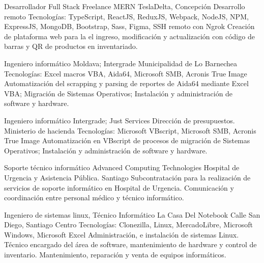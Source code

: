 \documentclass[draft,color,12pt,letterpaper,sans]{moderncv}
\begin{document}
{Desarrollador Full Stack Freelance MERN}
{TeslaDelta, Concepci\'on}
{\newline Desarrollo remoto}
{\newline Tecnolog\'ias: TypeScript, ReactJS, ReduxJS, Webpack, NodeJS, NPM, ExpressJS, MongoDB, Bootstrap, Sass, Figma, SSH remoto con Ngrok}
{Creaci\'on de plataforma web para la el ingreso, modificaci\'on y actualizaci\'on con c\'odigo de barras y QR de productos en inventariado.\newline}

{Ingeniero inform\'atico}
{Moldava; Intergrade}
{Municipalidad de Lo Barnechea}
{\newline Tecnolog\'ias: Excel macros VBA, Aida64, Microsoft SMB, Acronis True Image}
{Automatizaci\'on del scrapping y parsing de reportes de Aida64 mediante Excel VBA; Migraci\'on de Sistemas Operativos; Instalaci\'on y administraci\'on de software y hardware.\newline}


{Ingeniero inform\'atico}
{Intergrade; Just Services}
{Direcci\'on de presupuestos. Ministerio de hacienda}
{\newline Tecnolog\'ias: Microsoft VBscript, Microsoft SMB, Acronis True Image}
{Automatizaci\'on en VBscript de procesos de migraci\'on de Sistemas Operativos; Instalaci\'on y administraci\'on de software y hardware.\newline}

{Soporte t\'ecnico inform\'atico}
{Advanced Computing Technologies}
{Hospital de Urgencia y Asistencia P\'ublica. Santiago}
{}
{Subcontrataci\'on para la realizaci\'on de servicios de soporte inform\'atico en Hospital de Urgencia. Comunicaci\'on y coordinaci\'on entre personal m\'edico y t\'ecnico inform\'atico.\newline}

{Ingeniero de sistemas linux, T\'ecnico Inform\'atico}
{La Casa Del Notebook}
{Calle San Diego, Santiago Centro}
{\newline Tecnolog\'ias: Clonezilla, Linux, MercadoLibre, Microsoft Windows, Microsoft Excel}
{Administraci\'on, e instalaci\'on de sistemas Linux. T\'ecnico encargado del \'area de software, mantenimiento de hardware y control de inventario. Mantenimiento, reparaci\'on y venta de equipos inform\'aticos.\newline} 
\end{document}
